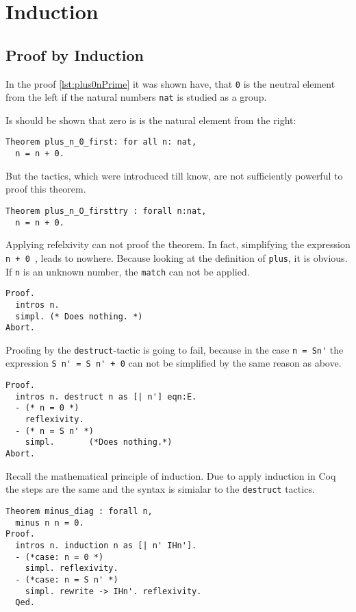 \section{Induction}

\subsection{Proof by Induction}
In the proof \ref{lst:plus0nPrime} it was shown have, 
that \lstinline!0! is the neutral element from the left if the natural numbers \lstinline!nat! is studied as a group. 

Is should be shown that zero is is the natural element from the right:
\begin{lstlisting}
Theorem plus_n_0_first: for all n: nat,
  n = n + 0.  
\end{lstlisting}

But the tactics, which were introduced till know, are not sufficiently powerful to proof this theorem.

\begin{lstlisting}
Theorem plus_n_O_firsttry : forall n:nat,
  n = n + 0.
\end{lstlisting}

Applying refelxivity can not proof the theorem. In fact, simplifying the expression \lstinline!n + 0 !, leads to nowhere.
Because looking at the definition of \lstinline!plus!, it is obvious.
If \lstinline!n! is an unknown number, the  \lstinline!match! can not be applied.
  
\begin{lstlisting}
Proof.
  intros n.
  simpl. (* Does nothing. *)
Abort.
\end{lstlisting}

Proofing by the \lstinline!destruct!-tactic is going to fail, because in the case \lstinline!n = Sn'! the expression \lstinline!S n' = S n' + 0! can not be simplified by the same reason as above.
\begin{lstlisting}
Proof.
  intros n. destruct n as [| n'] eqn:E.
  - (* n = 0 *)
    reflexivity. 
  - (* n = S n' *)
    simpl.       (*Does nothing.*)
Abort.
\end{lstlisting}

Recall the mathematical principle of induction.
Due to apply induction in Coq the steps are the same and the syntax is simialar to the \lstinline!destruct! tactics.
 

\begin{lstlisting}
Theorem minus_diag : forall n,
  minus n n = 0.
Proof.
  intros n. induction n as [| n' IHn'].
  - (*case: n = 0 *)
    simpl. reflexivity.
  - (*case: n = S n' *)
    simpl. rewrite -> IHn'. reflexivity.  
  Qed.
\end{lstlisting}

